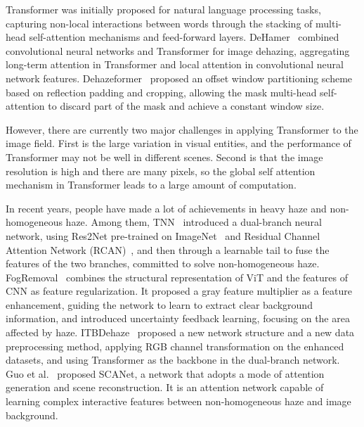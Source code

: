 \documentclass[lettersize,journal]{IEEEtran}
\begin{document}
Transformer\cite{vaswani2017attention} was initially proposed for natural language processing tasks, capturing non-local interactions between words through the stacking of multi-head self-attention mechanisms and feed-forward layers. DeHamer~\cite{guo2022image} combined convolutional neural networks and Transformer for image dehazing, aggregating long-term attention in Transformer and local attention in convolutional neural network features. Dehazeformer~\cite{song2023vision} proposed an offset window partitioning scheme based on reflection padding and cropping, allowing the mask multi-head self-attention to discard part of the mask and achieve a constant window size.

However, there are currently two major challenges in applying Transformer to the image field. First is the large variation in visual entities, and the performance of Transformer may not be well in different scenes. Second is that the image resolution is high and there are many pixels, so the global self attention mechanism in Transformer leads to a large amount of computation.

In recent years, people have made a lot of achievements in heavy haze and non-homogeneous haze. Among them, TNN~\cite{yu2021two} introduced a dual-branch neural network, using Res2Net pre-trained on ImageNet~\cite{deng2009imagenet} and Residual Channel Attention Network (RCAN)~\cite{zhang2018image}, and then through a learnable tail to fuse the features of the two branches, committed to solve non-homogeneous haze. FogRemoval~\cite{jin2022structure} combines the structural representation of ViT\cite{dosovitskiy2020image} and the features of CNN as feature regularization. It proposed a gray feature multiplier as a feature enhancement, guiding the network to learn to extract clear background information, and introduced uncertainty feedback learning, focusing on the area affected by haze. ITBDehaze~\cite{liu2023data} proposed a new network structure and a new data preprocessing method, applying RGB channel transformation on the enhanced datasets, and using Transformer as the backbone in the dual-branch network. Guo et al.~\cite{guo2023scanet} proposed SCANet, a network that adopts a mode of attention generation and scene reconstruction. It is an attention network capable of learning complex interactive features between non-homogeneous haze and image background.
\end{document}
